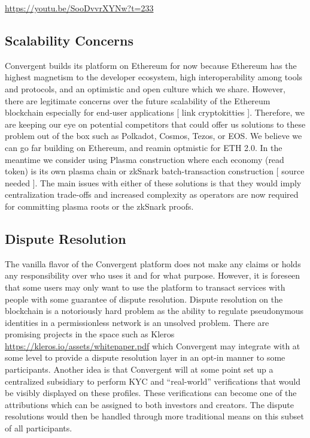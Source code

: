\documentclass[a4paper]{article}
\begin{document}
\url{https://youtu.be/SooDvvrXYNw?t=233}

\subsection{Scalability Concerns}

Convergent builds its platform on Ethereum for now because Ethereum has the highest magnetism to the developer ecosystem, high interoperability among tools and protocols, and an optimistic and open culture which we share. However, there are legitimate concerns over the future scalability of the Ethereum blockchain especially for end-user applications [ link cryptokitties ]. Therefore, we are keeping our eye on potential competitors that could offer us solutions to these problem out of the box such as Polkadot, Cosmos, Tezos, or EOS. We believe we can go far building on Ethereum, and reamin optmistic for ETH 2.0. In the meantime we consider using Plasma construction where each economy (read token) is its own plasma chain or zkSnark batch-transaction construction [ source needed ]. The main issues with either of these solutions is that they would imply centralization trade-offs and increased complexity as operators are now required for committing plasma roots or the zkSnark proofs. 

\subsection{Dispute Resolution}

The vanilla flavor of the Convergent platform does not make any claims or holds any responsibility over who uses it and for what purpose. However, it is foreseen that some users may only want to use the platform to transact services with people with some guarantee of dispute resolution. Dispute resolution on the blockchain is a notoriously hard problem as the ability to regulate pseudonymous identities in a permissionless network is an unsolved problem. There are promising projects in the space such as Kleros \url{https://kleros.io/assets/whitepaper.pdf} which Convergent may integrate with at some level to provide a dispute resolution layer in an opt-in manner to some participants. Another idea is that Convergent will at some point set up a centralized subsidiary to perform KYC and “real-world” verifications that would be visibly displayed on these profiles. These verifications can become one of the attributions which can be assigned to both investors and creators. The dispute resolutions would then be handled through more traditional means on this subset of all participants.
\end{document}
